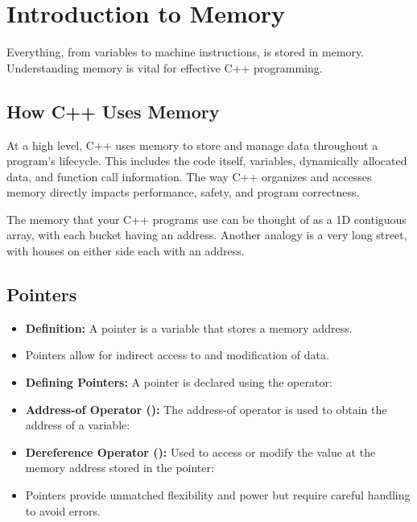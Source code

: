 \documentclass{article}
\begin{document}
\section{Introduction to Memory}

\noindent
Everything, from variables to machine instructions, is stored in memory. Understanding memory is vital for effective C++ programming.

\subsection{How C++ Uses Memory}

\noindent
At a high level, C++ uses memory to store and manage data throughout a program's lifecycle. This includes the code itself, variables, dynamically allocated data, and function call information. The way C++ organizes and accesses memory directly impacts performance, safety, and program correctness.

\vspace{1em}
\noindent
The memory that your C++ programs use can be thought of as a 1D contiguous array, with each bucket having an address. Another analogy is a very long street, with houses on either side each with an address.

\subsection{Pointers}

\begin{itemize}
	\item \textbf{Definition:} A pointer is a variable that stores a memory address.
	\item Pointers allow for indirect access to and modification of data.
	\item \textbf{Defining Pointers:} A pointer is declared using the \inlinecpp{*} operator:
	\item \textbf{Address-of Operator (\inlinecpp{&}):} The address-of operator \inlinecpp{&} is used to obtain the address of a variable:
	\item \textbf{Dereference Operator (\inlinecpp{*}):} Used to access or modify the value at the memory address stored in the pointer:
	\item Pointers provide unmatched flexibility and power but require careful handling to avoid errors.
	\end{itemize}
\end{document}
